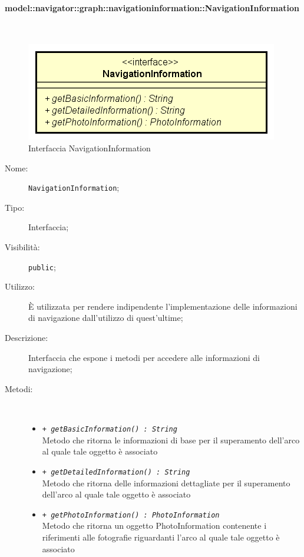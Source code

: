 \documentclass[../DefinizioneDiProdotto.tex]{subfiles}
\begin{document}
\paragraph{model::navigator::graph::navigationinformation::NavigationInformation}
\
\begin{figure}[H]
	\centering
	\includegraphics[width=\maxwidth]{img/NavigationInformation.png}
	\caption{Interfaccia NavigationInformation}\label{fig:model::navigator::graph::navigationinformation::NavigationInformation} 
\end{figure}
\begin{description}
	\item[Nome:] \texttt{NavigationInformation};
	\item[Tipo:] Interfaccia;
	\item[Visibilità:] \texttt{public};
	\item[Utilizzo:] È utilizzata per rendere indipendente l'implementazione delle informazioni di navigazione dall'utilizzo di quest'ultime;
	\item[Descrizione:] Interfaccia che espone i metodi per accedere alle informazioni di navigazione;
	\item[Metodi:] \
	\begin{itemize}
		\item \texttt{+ \textit{getBasicInformation() : String}}\\
		Metodo che ritorna le informazioni di base per il superamento dell'arco al quale tale oggetto è associato
		\item \texttt{+ \textit{getDetailedInformation() : String}}\\
		Metodo che ritorna delle informazioni dettagliate per il superamento dell'arco al quale tale oggetto è associato
		\item \texttt{+ \textit{getPhotoInformation() : PhotoInformation}}\\
		Metodo che ritorna un oggetto PhotoInformation contenente i riferimenti alle fotografie riguardanti l'arco al quale tale oggetto è associato
	\end{itemize}
\end{description}
\end{document}
